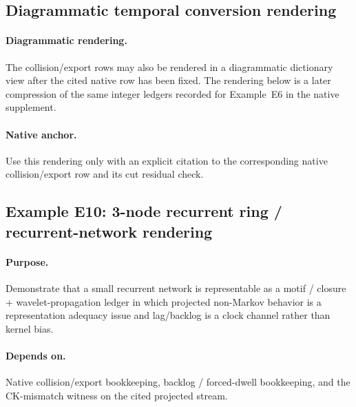 \subsection{Diagrammatic temporal conversion rendering}\label{app:feynman-dict}
\paragraph{Diagrammatic rendering.} The collision/export rows may also be rendered in a diagrammatic dictionary view after the cited native row has been fixed. The rendering below is a later compression of the same integer ledgers recorded for Example~E6 in the native supplement.

\begin{center}
\end{center}

\paragraph{Native anchor.} Use this rendering only with an explicit citation to the corresponding native collision/export row and its cut residual check.


\subsection{Example E10: 3-node recurrent ring / recurrent-network rendering}\label{app:e10-neural}
\paragraph{Purpose.} Demonstrate that a small recurrent network is representable as a motif / closure + wavelet-propagation ledger in which projected non-Markov behavior is a representation adequacy issue and lag/backlog is a clock channel rather than kernel bias.
\paragraph{Depends on.} Native collision/export bookkeeping, backlog / forced-dwell bookkeeping, and the CK-mismatch witness on the cited projected stream.
